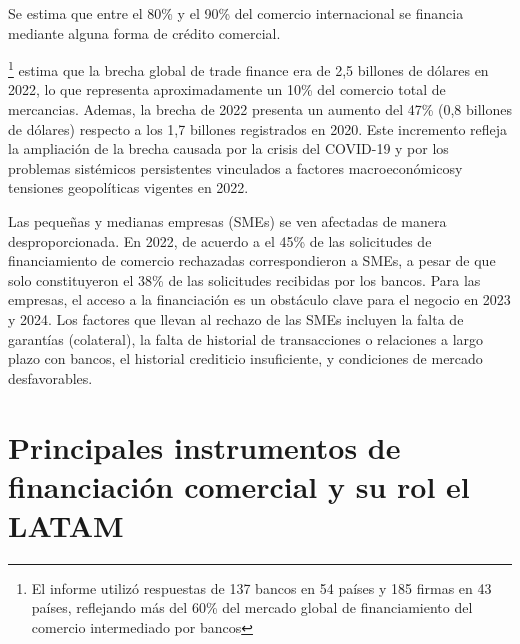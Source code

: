 \documentclass[11pt]{article}
\begin{document}
Se estima que entre el 80\% y el 90\% del comercio internacional se financia mediante alguna forma de crédito comercial.\citet{wto2019trade}

\citet{ADB2023TradeFinanceSurvey}\footnote{El informe utilizó respuestas de 137 bancos en 54 países y 185 firmas en 43 países, reflejando más del 60\% del mercado global de financiamiento del comercio intermediado por bancos} estima que la brecha global de trade finance era de 2,5 billones de dólares en 2022, lo que representa aproximadamente un 10\% del comercio total de mercancias. Ademas, la brecha  de 2022 presenta un aumento del 47\% (0,8 billones de dólares) respecto a los 1,7 billones registrados en 2020. Este incremento refleja la ampliación de la brecha causada por la crisis del COVID-19 y por los problemas sistémicos persistentes vinculados a factores macroeconómicosy tensiones geopolíticas vigentes en 2022.


Las pequeñas y medianas empresas (SMEs) se ven afectadas de manera desproporcionada. En 2022, de acuerdo a \citet{ADB2023TradeFinanceSurvey} el 45\% de las solicitudes de financiamiento de comercio rechazadas correspondieron a SMEs, a pesar de que solo constituyeron el 38\% de las solicitudes recibidas por los bancos. Para las empresas, el acceso a la financiación es un obstáculo clave para el negocio en 2023 y 2024. Los factores que llevan al rechazo de las SMEs incluyen la falta de garantías (colateral), la falta de historial de transacciones o relaciones a largo plazo con bancos, el historial crediticio insuficiente, y condiciones de mercado desfavorables.

\section{Principales instrumentos de financiación comercial y su rol el LATAM}
\end{document}
